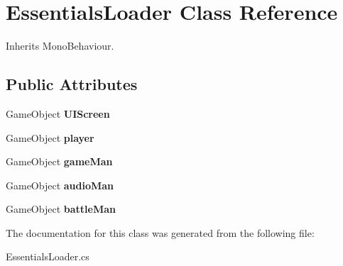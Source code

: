 \hypertarget{class_essentials_loader}{}\section{Essentials\+Loader Class Reference}
\label{class_essentials_loader}


Inherits Mono\+Behaviour.

\subsection*{Public Attributes}
\begin{DoxyCompactItemize}
\item 
\mbox{\label{class_essentials_loader_a9b223eb7f743e6cc615137b3018d1685}} 
Game\+Object {\bfseries U\+I\+Screen}
\item 
\mbox{\label{class_essentials_loader_ad3509d9c6eca09da423dd1bdab0eea3b}} 
Game\+Object {\bfseries player}
\item 
\mbox{\label{class_essentials_loader_af3242fe01902427bce9c053a451f1b02}} 
Game\+Object {\bfseries game\+Man}
\item 
\mbox{\label{class_essentials_loader_ac7a954467f6faba98bdf8dfd366b96bb}} 
Game\+Object {\bfseries audio\+Man}
\item 
\mbox{\label{class_essentials_loader_a95ce4e8ea4661995987d5787132e3f09}} 
Game\+Object {\bfseries battle\+Man}
\end{DoxyCompactItemize}


The documentation for this class was generated from the following file\+:\begin{DoxyCompactItemize}
\item 
Essentials\+Loader.\+cs\end{DoxyCompactItemize}
